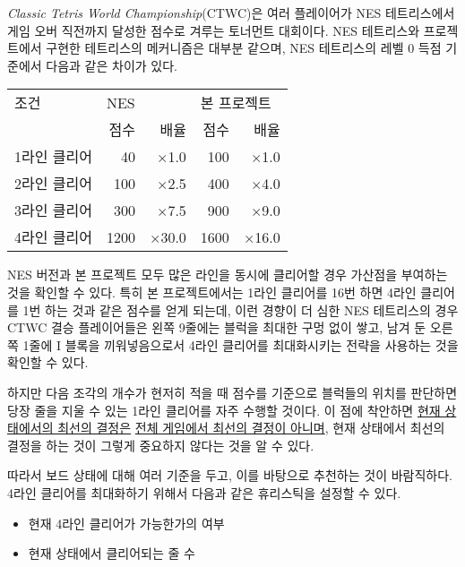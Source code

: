 \textit{Classic Tetris World Championship}(CTWC)은 여러 플레이어가 NES 테트리스에서
게임 오버 직전까지 달성한 점수로 겨루는 토너먼트 대회이다. NES 테트리스와 프로젝트에서 구현한 테트리스의 메커니즘은 대부분 같으며, NES 테트리스의
레벨 0 득점 기준에서 다음과 같은 차이가 있다.

\begin{center}
    \begin{tabular}{l|rr|rr}
        조건 & \multicolumn{2}{l|}{NES} & \multicolumn{2}{l}{본 프로젝트} \\
         & 점수 & 배율 & 점수 & 배율 \\
        \hline
        1라인 클리어 & 40 & $\times$1.0 & 100 & $\times$1.0 \\
        2라인 클리어 & 100 & $\times$2.5 & 400 & $\times$4.0 \\
        3라인 클리어 & 300 & $\times$7.5 & 900 & $\times$9.0 \\
        4라인 클리어 & 1200 & $\times$30.0 & 1600 & $\times$16.0 \\
    \end{tabular}    
\end{center}

NES 버전과 본 프로젝트 모두 많은 라인을 동시에 클리어할 경우 가산점을 부여하는 것을 확인할 수 있다.
특히 본 프로젝트에서는 1라인 클리어를 16번 하면 4라인 클리어를 1번 하는 것과 같은 점수를 얻게 되는데, 이런 경향이 더 심한 NES 테트리스의 경우
CTWC 결승 플레이어들은 왼쪽 9줄에는 블럭을 최대한 구멍 없이 쌓고, 남겨 둔 오른쪽 1줄에 I 블록을 끼워넣음으로서
4라인 클리어를 최대화시키는 전략을 사용하는 것을 확인할 수 있다.\cite{CTWC}

하지만 다음 조각의 개수가 현저히 적을 때 점수를 기준으로 블럭들의 위치를 판단하면 당장 줄을 지울 수 있는 1라인 클리어를 자주 수행할 것이다.
이 점에 착안하면 \underline{현재 상태에서의 최선의 결정은}
\underline{전체 게임에서 최선의 결정이 아니며}, 현재 상태에서 최선의 결정을 하는 것이 그렇게 중요하지 않다는 것을 알 수 있다.

따라서 보드 상태에 대해 여러 기준을 두고, 이를 바탕으로 추천하는 것이 바람직하다. 4라인 클리어를 최대화하기
위해서 다음과 같은 휴리스틱을 설정할 수 있다.

\begin{itemize}
    \item 현재 4라인 클리어가 가능한가의 여부
    \item 현재 상태에서 클리어되는 줄 수
\end{itemize}

